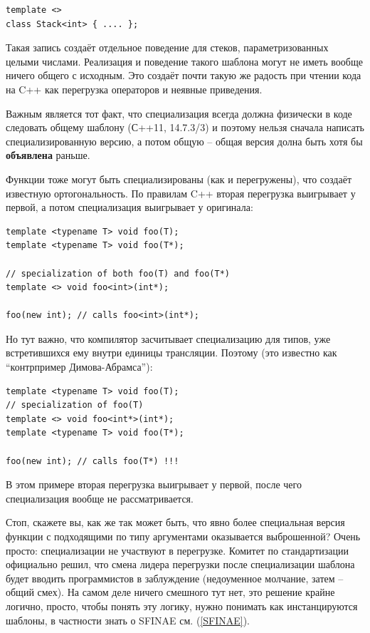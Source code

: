 \documentclass[a4paper,12pt,oneside]{article}
\begin{document}
\begin{lstlisting}
template <>
class Stack<int> { .... };
\end{lstlisting}

Такая запись создаёт отдельное поведение для стеков, параметризованных целыми числами. Реализация и поведение такого шаблона могут не иметь вообще ничего общего с исходным. Это создаёт почти такую же радость при чтении кода на C++ как перегрузка операторов и неявные приведения.

Важным является тот факт, что специализация всегда должна физически в коде следовать общему шаблону (С++11, 14.7.3/3) и поэтому нельзя сначала написать специализированную версию, а потом общую -- общая версия долна быть хотя бы \textbf{объявлена} раньше.

Функции тоже могут быть специализированы (как и перегружены), что создаёт известную ортогональность. По правилам C++ вторая перегрузка выигрывает у первой, а потом специализация выигрывает у оригинала:

\begin{lstlisting}
template <typename T> void foo(T);
template <typename T> void foo(T*); 

// specialization of both foo(T) and foo(T*)
template <> void foo<int>(int*); 

foo(new int); // calls foo<int>(int*);
\end{lstlisting}

Но тут важно, что компилятор засчитывает специализацию для типов, уже встретившихся ему внутри единицы трансляции. Поэтому (это известно как ``контрпример Димова-Абрамса''):

\begin{lstlisting}
template <typename T> void foo(T);
// specialization of foo(T)
template <> void foo<int*>(int*); 
template <typename T> void foo(T*);

foo(new int); // calls foo(T*) !!!
\end{lstlisting}

В этом примере вторая перегрузка выигрывает у первой, после чего специализация вообще не рассматривается.

Стоп, скажете вы, как же так может быть, что явно более специальная версия функции с подходящими по типу аргументами оказывается выброшенной? Очень просто: специализации не участвуют в перегрузке. Комитет по стандартизации официально решил, что смена лидера перегрузки после специализации шаблона будет вводить программистов в заблуждение (недоуменное молчание, затем -- общий смех). На самом деле ничего смешного тут нет, это решение крайне логично, просто, чтобы понять эту логику, нужно понимать как инстанцируются шаблоны, в частности знать о SFINAE см. (\ref{SFINAE}).
\end{document}
